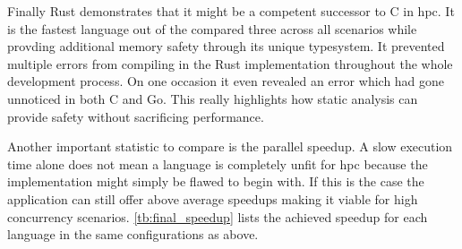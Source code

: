 Finally Rust demonstrates that it might be a competent successor to C in \gls{hpc}. It is the fastest language out of the compared three across all scenarios while provding additional memory safety through its unique typesystem. It prevented multiple errors from compiling in the Rust implementation throughout the whole development process. On one occasion it even revealed an error which had gone unnoticed in both C and Go. This really highlights how static analysis can provide safety without sacrificing performance.

Another important statistic to compare is the parallel speedup. A slow execution time alone does not mean a language is completely unfit for \gls{hpc} because the implementation might simply be flawed to begin with. If this is the case the application can still offer above average speedups making it viable for high concurrency scenarios. \autoref{tb:final_speedup} lists the achieved speedup for each language in the same configurations as above.

